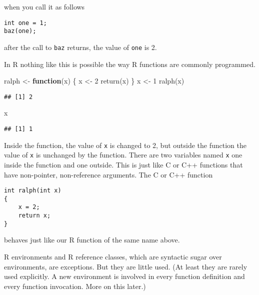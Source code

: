 \documentclass[
]{article}
\newenvironment{Shaded}{\begin{snugshade}}{\end{snugshade}}
\newcommand{\ControlFlowTok}[1]{\textcolor[rgb]{0.13,0.29,0.53}{\textbf{#1}}}
\newcommand{\DecValTok}[1]{\textcolor[rgb]{0.00,0.00,0.81}{#1}}
\newcommand{\FunctionTok}[1]{\textcolor[rgb]{0.00,0.00,0.00}{#1}}
\newcommand{\NormalTok}[1]{#1}
\newcommand{\OtherTok}[1]{\textcolor[rgb]{0.56,0.35,0.01}{#1}}
\begin{document}
when you call it as follows

\begin{verbatim}
int one = 1;
baz(one);
\end{verbatim}

after the call to \texttt{baz} returns, the value of \texttt{one} is 2.

In R nothing like this is possible the way R functions are commonly
programmed.

\begin{Shaded}
\begin{Highlighting}[]
\NormalTok{ralph }\OtherTok{\textless{}{-}} \ControlFlowTok{function}\NormalTok{(x) \{}
\NormalTok{    x }\OtherTok{\textless{}{-}} \DecValTok{2}
    \FunctionTok{return}\NormalTok{(x)}
\NormalTok{\}}
\NormalTok{x }\OtherTok{\textless{}{-}} \DecValTok{1}
\FunctionTok{ralph}\NormalTok{(x)}
\end{Highlighting}
\end{Shaded}

\begin{verbatim}
## [1] 2
\end{verbatim}

\begin{Shaded}
\begin{Highlighting}[]
\NormalTok{x}
\end{Highlighting}
\end{Shaded}

\begin{verbatim}
## [1] 1
\end{verbatim}

Inside the function, the value of \texttt{x} is changed to 2, but
outside the function the value of \texttt{x} is unchanged by the
function. There are two variables named \texttt{x} one inside the
function and one outside. This is just like C or C++ functions that have
non-pointer, non-reference arguments. The C or C++ function

\begin{verbatim}
int ralph(int x)
{
    x = 2;
    return x;
}
\end{verbatim}

behaves just like our R function of the same name above.

R environments and R reference classes, which are syntactic sugar over
environments, are exceptions. But they are little used. (At least they
are rarely used explicitly. A new environment is involved in every
function definition and every function invocation. More on this later.)
\end{document}
